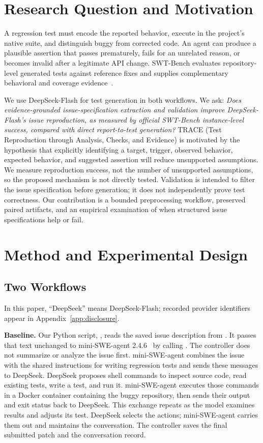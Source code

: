 \section{Research Question and Motivation}
A regression test must encode the reported behavior, execute in the project's native suite, and distinguish buggy from corrected code. An agent can produce a plausible assertion that passes prematurely, fails for an unrelated reason, or becomes invalid after a legitimate API change. SWT-Bench evaluates repository-level generated tests against reference fixes and supplies complementary behavioral and coverage evidence~\cite{swtpaper,swtrepo}.

We use DeepSeek-Flash for test generation in both workflows. We ask: \emph{Does evidence-grounded issue-specification extraction and validation improve DeepSeek-Flash's issue reproduction, as measured by official SWT-Bench instance-level success, compared with direct report-to-test generation?} TRACE (Test Reproduction through Analysis, Checks, and Evidence) is motivated by the hypothesis that explicitly identifying a target, trigger, observed behavior, expected behavior, and suggested assertion will reduce unsupported assumptions. We measure reproduction success, not the number of unsupported assumptions, so the proposed mechanism is not directly tested. Validation is intended to filter the issue specification before generation; it does not independently prove test correctness. Our contribution is a bounded preprocessing workflow, preserved paired artifacts, and an empirical examination of when structured issue specifications help or fail.

\section{Method and Experimental Design}\label{sec:method}
\subsection{Two Workflows}
In this paper, ``DeepSeek'' means DeepSeek-Flash; recorded provider identifiers appear in Appendix~\ref{app:disclosure}.

\textbf{Baseline.} Our Python script, , reads the saved issue description from . It passes that text unchanged to mini-SWE-agent 2.4.6~\cite{mini} by calling . The controller does not summarize or analyze the issue first. mini-SWE-agent combines the issue with the shared instructions for writing regression tests and sends these messages to DeepSeek. DeepSeek proposes shell commands to inspect source code, read existing tests, write a test, and run it. mini-SWE-agent executes those commands in a Docker container containing the buggy repository, then sends their output and exit status back to DeepSeek. This exchange repeats as the model examines results and adjusts its test. DeepSeek selects the actions; mini-SWE-agent carries them out and maintains the conversation. The controller saves the final submitted patch and the conversation record.

